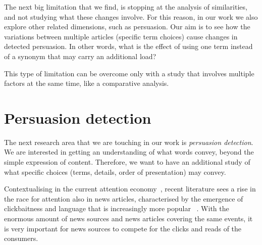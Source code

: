 The next big limitation that we find, is stopping at the analysis of similarities, and not studying what these changes involve.
For this reason, in our work we also explore other related dimensions, such as persuasion.
Our aim is to see how the variations between multiple articles (specific term choices) cause changes in detected persuasion. In other words, what is the effect of using one term instead of a synonym that may carry an additional load?


This type of limitation can be overcome only with a study that involves multiple factors at the same time, like a comparative analysis.

\section{\statusgreen Persuasion detection}
\label{sec:lit_persuasion}

The next research area that we are touching in our work is \emph{persuasion detection}.
We are interested in getting an understanding of what words convey, beyond the simple expression of content.
Therefore, we want to have an additional study of what specific choices (terms, details, order of presentation) may convey.



Contextualising in the current attention economy~\citep{davenport2001attention}, recent literature sees a rise in the race for attention also in news articles, characterised by the emergence of clickbaitness and language that is increasingly more popular ~\citep{bazaco2019clickbait,davenport2001attention}.
With the enormous amount of news sources and news articles covering the same events, it is very important for news sources to compete for the clicks and reads of the consumers.

